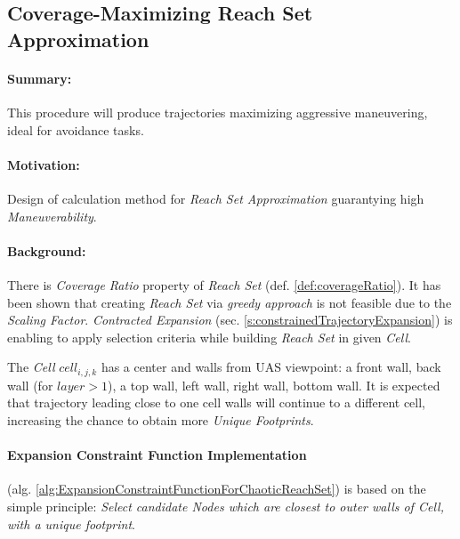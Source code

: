 \subsection{Coverage-Maximizing Reach Set Approximation}\label{s:chaoticReachSet}

\paragraph{Summary:}  	This procedure will produce trajectories maximizing aggressive maneuvering, ideal for avoidance tasks.

\paragraph{Motivation:} Design of calculation method for \emph{Reach Set Approximation} guarantying high \emph{Maneuverability}.

\paragraph{Background:}There is \emph{Coverage Ratio} property of \emph{Reach Set} (def. \ref{def:coverageRatio}). It has been shown that creating \emph{Reach Set} via \emph{greedy approach} is not feasible due to the \emph{Scaling Factor}.  \emph{Contracted Expansion} (sec. \ref{s:constrainedTrajectoryExpansion}) is enabling to apply selection criteria while building \emph{Reach Set} in given \emph{Cell}. 

The \emph{Cell} $cell_{i,j,k}$ has a center and walls from UAS viewpoint: a front wall, back wall (for $layer > 1$), a top wall, left wall, right wall, bottom wall. It is expected that trajectory leading close to one cell walls will continue to a different cell, increasing the chance to obtain more \emph{Unique Footprints}. 

\paragraph{Expansion Constraint Function Implementation} (alg. \ref{alg:ExpansionConstraintFunctionForChaoticReachSet}) is based on the simple principle: \emph{Select candidate Nodes which are  closest to outer walls of Cell, with a unique footprint}.

